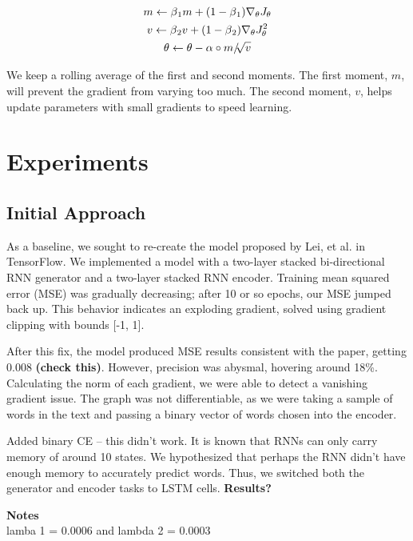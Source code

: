 \documentclass{article} %
\begin{document}
\begin{gather}
m \leftarrow \beta \textsubscript{1} m + 
(1 - \beta \textsubscript{1}) \nabla_{\theta} J_\theta \\
v \leftarrow \beta \textsubscript{2} v + 
(1 - \beta \textsubscript{2}) \nabla_{\theta} J_\theta^2\\
\theta \leftarrow \theta - \alpha \circ m / \sqrt[]{v}
\end{gather}

We keep a rolling average of the first and second moments. The first moment,
$m$, will prevent the gradient from varying too much. The second moment, $v$,
helps update parameters with small gradients to speed learning.

\section{Experiments}

\subsection{Initial Approach}

As a baseline, we sought to re-create the model proposed by Lei, et al. in
TensorFlow. We implemented a model with a two-layer stacked bi-directional RNN
generator and a two-layer stacked RNN encoder. Training mean squared error (MSE)
was gradually decreasing; after 10 or so epochs, our MSE jumped back up. This
behavior indicates an exploding gradient, solved using gradient clipping with
bounds [-1, 1].

After this fix, the model produced MSE results consistent with the paper,
getting 0.008 \textbf{(check this)}. However, precision was abysmal, hovering
around 18\%. Calculating the norm of each gradient, we were able to detect a
vanishing gradient issue. The graph was not differentiable, as we were taking a
sample of words in the text and passing a binary vector of words chosen into the
encoder.

Added binary CE -- this didn't work. It is known that RNNs can only carry memory
of around 10 states. We hypothesized that perhaps the RNN didn't have enough
memory to accurately predict words. Thus, we switched both the generator and
encoder tasks to LSTM cells. \textbf{Results?}




\textbf{Notes} \\

lamba 1 = 0.0006 and lambda 2 = 0.0003 \\
\end{document}
